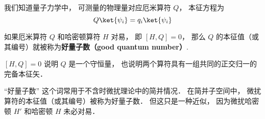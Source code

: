 
\begin{issues}
\issueDraft
{}
\end{issues}


我们知道量子力学中， 可测量的物理量对应厄米算符 $Q$， 本征方程为
\begin{equation}\label{GoodQN_eq1}
Q \ket{\psi_i} = q_i \ket{\psi_i}
\end{equation}

\begin{definition}{}
如果厄米算符 $Q$ 和哈密顿算符 $H$ 对易， 即 $[H, Q] = 0$， 那么 $Q$ 的本征值（或其编号）就被称为\textbf{好量子数（good quantum number）}.
\end{definition}

$[H, Q] = 0$ 说明 $Q$ 是一个守恒量， 也说明两个算符具有一组共同的正交归一的完备本征矢．

“好量子数” 这个词常用于不含时微扰理论中的简并情况． 在简并子空间中， 微扰算符的本征值（或其编号）被称为好量子数． 但这只是一种近似， 因为微扰哈密顿 $H'$ 和哈密顿 $H$ 未必对易．
